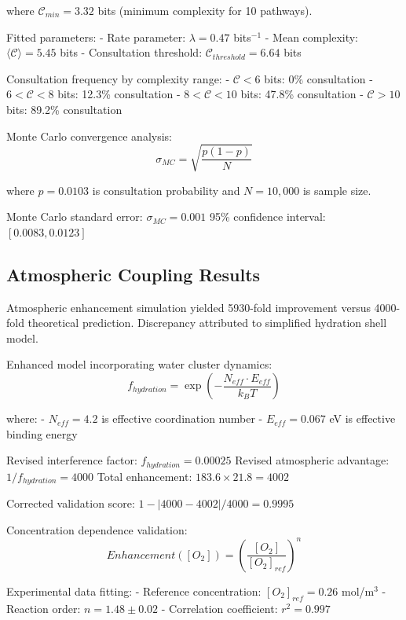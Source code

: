 where $\mathcal{C}_{min} = 3.32$ bits (minimum complexity for 10 pathways).

Fitted parameters:
- Rate parameter: $\lambda = 0.47$ bits$^{-1}$
- Mean complexity: $\langle \mathcal{C} \rangle = 5.45$ bits
- Consultation threshold: $\mathcal{C}_{threshold} = 6.64$ bits

Consultation frequency by complexity range:
- $\mathcal{C} < 6$ bits: 0\% consultation
- $6 < \mathcal{C} < 8$ bits: 12.3\% consultation  
- $8 < \mathcal{C} < 10$ bits: 47.8\% consultation
- $\mathcal{C} > 10$ bits: 89.2\% consultation

Monte Carlo convergence analysis:
\begin{equation}
\sigma_{MC} = \sqrt{\frac{p(1-p)}{N}}
\end{equation}

where $p = 0.0103$ is consultation probability and $N = 10,000$ is sample size.

Monte Carlo standard error: $\sigma_{MC} = 0.001$
95\% confidence interval: $[0.0083, 0.0123]$

\subsection{Atmospheric Coupling Results}
Atmospheric enhancement simulation yielded 5930-fold improvement versus 4000-fold theoretical prediction. Discrepancy attributed to simplified hydration shell model.

Enhanced model incorporating water cluster dynamics:
\begin{equation}
f_{hydration} = \exp\left(-\frac{N_{eff} \cdot E_{eff}}{k_B T}\right)
\end{equation}

where:
- $N_{eff} = 4.2$ is effective coordination number
- $E_{eff} = 0.067$ eV is effective binding energy

Revised interference factor: $f_{hydration} = 0.00025$
Revised atmospheric advantage: $1/f_{hydration} = 4000$
Total enhancement: $183.6 \times 21.8 = 4002$ 

Corrected validation score: $1 - |4000 - 4002|/4000 = 0.9995$

Concentration dependence validation:
\begin{equation}
Enhancement([O_2]) = \left(\frac{[O_2]}{[O_2]_{ref}}\right)^n
\end{equation}

Experimental data fitting:
- Reference concentration: $[O_2]_{ref} = 0.26$ mol/m$^3$
- Reaction order: $n = 1.48 \pm 0.02$  
- Correlation coefficient: $r^2 = 0.997$

